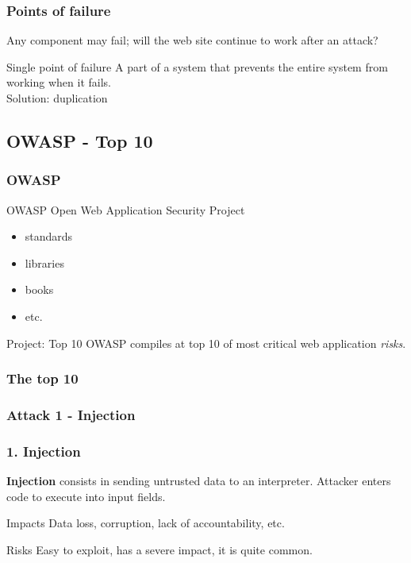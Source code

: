 
\begin{frame}
\frametitle{Points of failure}
Any component may fail; will the web site continue to work after an attack?
\begin{block}{Single point of failure}
A part of a system that prevents the entire system from working when it fails.
\\ Solution: duplication
\end{block}
\end{frame}

\subsection{OWASP - Top 10}

\begin{frame}
\frametitle{OWASP}
\begin{block}{OWASP}
\centering Open Web Application Security Project
\begin{itemize}
\item standards
\item libraries
\item books
\item etc.
\end{itemize}
\end{block}
\begin{block}{Project: Top 10}
OWASP compiles at top 10 of most critical web application \emph{risks}.
\end{block}
\end{frame}

\begin{frame}
\frametitle{The top 10}
\end{frame}


\subsubsection{Attack 1 - Injection}

\begin{frame}
\frametitle{1. Injection}
\textbf{Injection} consists in sending untrusted data to an interpreter.
Attacker enters code to execute into input fields.
\begin{block}{Impacts}
Data loss, corruption, lack of accountability, etc.
\end{block}
\begin{block}{Risks}
\alert{Easy to exploit}, has a \alert{severe impact}, it is quite common.
\end{block}
\end{frame}

